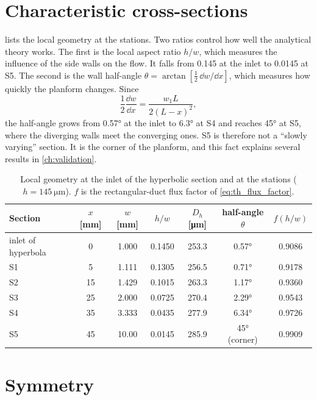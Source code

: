 \section{Characteristic cross-sections}

 lists the local geometry at the stations. Two ratios control how well the analytical theory works. The first is the local aspect ratio $h/w$, which measures the influence of the side walls on the flow. It falls from 0.145 at the inlet to 0.0145 at S5. The second is the wall half-angle $\theta=\arctan[\tfrac12\,\dd w/\dd x]$, which measures how quickly the planform changes. Since
\begin{equation}
\frac{1}{2}\frac{\dd w}{\dd x}=\frac{w_1L}{2(L-x)^2},
\label{eq:geo_slope}
\end{equation}
the half-angle grows from \ang{0.57} at the inlet to \ang{6.3} at S4 and reaches \ang{45} at S5, where the diverging walls meet the converging ones. S5 is therefore not a ``slowly varying'' section. It is the corner of the planform, and this fact explains several results in \cref{ch:validation}.

\begin{table}[htbp]
\centering
\caption{Local geometry at the inlet of the hyperbolic section and at the stations ($h=\SI{145}{\micro\metre}$). $f$ is the rectangular-duct flux factor of \cref{eq:th_flux_factor}.}
\label{tab:stations}
\small
\begin{tabular}{@{}lcccccc@{}}
\toprule
Section & $x$ [mm] & $w$ [mm] & $h/w$ & $D_h$ [\si{\micro\metre}] & half-angle $\theta$ & $f(h/w)$\\
\midrule
inlet of hyperbola & 0 & 1.000 & 0.1450 & 253.3 & \ang{0.57} & 0.9086\\
S1 & 5 & 1.111 & 0.1305 & 256.5 & \ang{0.71} & 0.9178\\
S2 & 15 & 1.429 & 0.1015 & 263.3 & \ang{1.17} & 0.9360\\
S3 & 25 & 2.000 & 0.0725 & 270.4 & \ang{2.29} & 0.9543\\
S4 & 35 & 3.333 & 0.0435 & 277.9 & \ang{6.34} & 0.9726\\
S5 & 45 & 10.00 & 0.0145 & 285.9 & \ang{45} (corner) & 0.9909\\
\bottomrule
\end{tabular}
\end{table}

\section{Symmetry}

